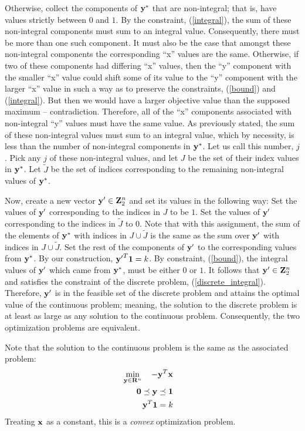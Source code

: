 \documentclass[12pt]{article}
\begin{document}
Otherwise, collect the components of ${\bf y}^*$ 
that are non-integral; that is, have values strictly between $0$ and $1$.
By the constraint, (\ref{integral}), the sum of these non-integral components
must sum to an integral value. Consequently, there must be more than one such
component. It must also be the case that amongst these non-integral components 
the corresponding ``x'' values are the same. Otherwise, if two of these components 
had differing ``x'' values, then the ``y'' component with the 
smaller ``x'' value could shift some of its value to the ``y'' component with 
the larger ``x'' value in such a way as to preserve the constraints, 
(\ref{bound}) and (\ref{integral}). 
But then we would have a larger objective value than the supposed maximum 
-- contradiction. Therefore, all of the 
``x'' components associated with non-integral ``y'' values must have the same 
value. As previously stated, the sum of these non-integral values must sum 
to an integral value, which by necessity, is less than the number of 
non-integral components in ${\bf y}^*$. Let us call this number, $j$. 
Pick any $j$ of these non-integral values, and let $J$ be the set of their index
values in ${\bf y}^*$.
Let ${\tilde J}$ be the set of indices corresponding to the remaining non-integral values
of ${\bf y}^*$.

Now, create a new 
vector ${\bf y}^\prime \in {\bf Z}_2^n$ and set its values in the following way: 
Set the values of ${\bf y}^\prime$ corresponding to the indices in $J$
to be $1$. Set the values of ${\bf y}^\prime$ corresponding to the indices in ${\tilde J}$
to $0$. Note that with this assignment, the sum of the elements of 
${\bf y}^*$ with indices in $J \cup {\tilde J}$ is the same as the sum over ${\bf y}^\prime$ 
with indices in $J \cup {\tilde J}$.
Set the rest of the components of ${\bf y}^\prime$ to the 
corresponding values from ${\bf y}^*$. By our construction, 
${{\bf y}^\prime}^T {\bf 1} = k$. By constraint, (\ref{bound}), the integral 
values of ${\bf y}^\prime$ which came from ${\bf y}^*$, must
be either $0$ or $1$. It follows that ${\bf y}^\prime \in {\bf Z}_2^n$ and 
satisfies the constraint of the discrete problem, (\ref{discrete_integral}). 
Therefore, ${\bf y}^\prime$ is in the feasible set of the discrete problem and 
attains the optimal value of the continuous problem; meaning, the 
solution to the discrete problem is at least as large as any solution to the 
continuous problem. Consequently, the two optimization problems are equivalent.

Note that the solution to the continuous problem is the same as the associated problem:
\begin{eqnarray}
	\mathop{\rm min}_{{\bf y} \in {\bf R}^n}\limits \quad -{\bf y}^T {\bf x} && \label{op1} \\ 
	{\bf 0} \preceq {\bf y} \preceq {\bf 1} &&  \label{op2}\\
	{\bf y}^T {\bf 1} =  k \label{op3} &&
\end{eqnarray}
Treating ${\bf x}$ as a constant, this is a {\it convex\/} optimization problem.
\end{document}

